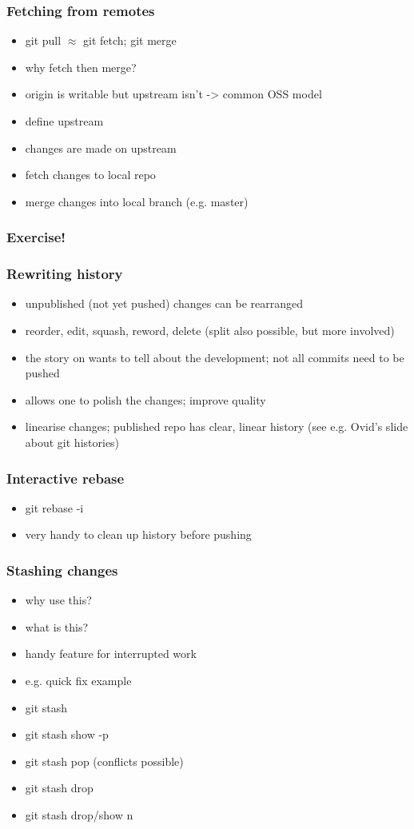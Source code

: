 \documentclass{git_course}
\begin{document}
\begin{frame}
\frametitle{Fetching from remotes}
\begin{itemize}
    \item git pull $\approx$ git fetch; git merge
    \item why fetch then merge?
    \item origin is writable but upstream isn't -> common OSS model
    \item define upstream
    \item changes are made on upstream
    \item fetch changes to local repo
    \item merge changes into local branch (e.g. master)
\end{itemize}
\end{frame}

\begin{frame}
\frametitle{Exercise!}
\end{frame}

\begin{frame}
\frametitle{Rewriting history}
\begin{itemize}
    \item unpublished (not yet pushed) changes can be rearranged
    \item reorder, edit, squash, reword, delete (split also possible,
        but more involved)
    \item the story on wants to tell about the development; not all
        commits need to be pushed
    \item allows one to polish the changes; improve quality
    \item linearise changes; published repo has clear, linear history
        (see e.g. Ovid's slide about git histories)
\end{itemize}
\end{frame}

\begin{frame}
\frametitle{Interactive rebase}
\begin{itemize}
    \item git rebase -i
    \item very handy to clean up history before pushing
\end{itemize}
\end{frame}

\begin{frame}
\frametitle{Stashing changes}
\begin{itemize}
    \item why use this?
    \item what is this?
    \item handy feature for interrupted work
    \item e.g. quick fix example
    \item git stash
    \item git stash show -p
    \item git stash pop (conflicts possible)
    \item git stash drop
    \item git stash drop/show {n}
\end{itemize}
\end{frame}
\end{document}
